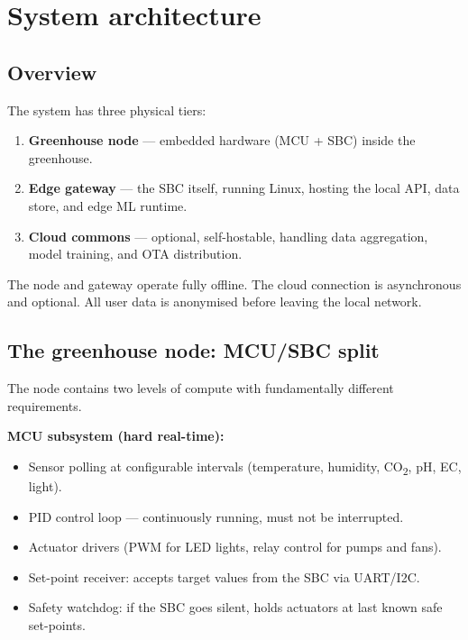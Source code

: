 \section{System architecture}

\subsection{Overview}

The system has three physical tiers:

\begin{enumerate}
  \item \textbf{Greenhouse node} --- embedded hardware (MCU + SBC) inside the greenhouse.
  \item \textbf{Edge gateway} --- the SBC itself, running Linux, hosting the local API, data store, and edge ML runtime.
  \item \textbf{Cloud commons} --- optional, self-hostable, handling data aggregation, model training, and OTA distribution.
\end{enumerate}

The node and gateway operate fully offline. The cloud connection is asynchronous and optional. All user data is anonymised before leaving the local network.

\subsection{The greenhouse node: MCU/SBC split}

The node contains two levels of compute with fundamentally different requirements.

\textbf{MCU subsystem (hard real-time):}
\begin{itemize}
  \item Sensor polling at configurable intervals (temperature, humidity, CO\textsubscript{2}, pH, EC, light).
  \item PID control loop --- continuously running, must not be interrupted.
  \item Actuator drivers (PWM for LED lights, relay control for pumps and fans).
  \item Set-point receiver: accepts target values from the SBC via UART/I2C.
  \item Safety watchdog: if the SBC goes silent, holds actuators at last known safe set-points.
\end{itemize}

